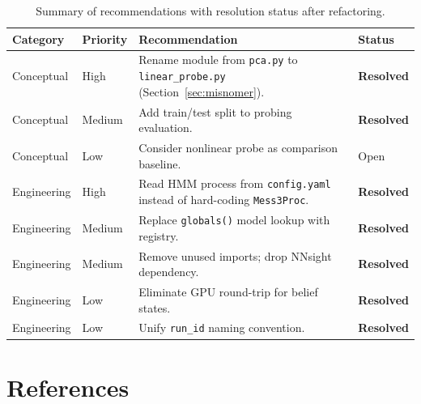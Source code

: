 \documentclass[11pt]{article}
\newcommand{\code}[1]{\texttt{#1}}
\newcommand{\file}[1]{\texttt{#1}}
\begin{document}
\begin{table}[htbp]
  \centering
  \begin{tabular}{l l p{5.5cm} l}
    \toprule
    Category & Priority & Recommendation & Status \\
    \midrule
    Conceptual & High & Rename module from \file{pca.py} to \file{linear\_probe.py} (Section~\ref{sec:misnomer}). & \textbf{Resolved} \\
    Conceptual & Medium & Add train/test split to probing evaluation. & \textbf{Resolved} \\
    Conceptual & Low & Consider nonlinear probe as comparison baseline. & Open \\
    \midrule
    Engineering & High & Read HMM process from \file{config.yaml} instead of hard-coding \code{Mess3Proc}. & \textbf{Resolved} \\
    Engineering & Medium & Replace \code{globals()} model lookup with registry. & \textbf{Resolved} \\
    Engineering & Medium & Remove unused imports; drop NNsight dependency. & \textbf{Resolved} \\
    Engineering & Low & Eliminate GPU round-trip for belief states. & \textbf{Resolved} \\
    Engineering & Low & Unify \code{run\_id} naming convention. & \textbf{Resolved} \\
    \bottomrule
  \end{tabular}
  \caption{Summary of recommendations with resolution status after refactoring.}
  \label{tab:recommendations}
\end{table}

\section*{References}
\end{document}
